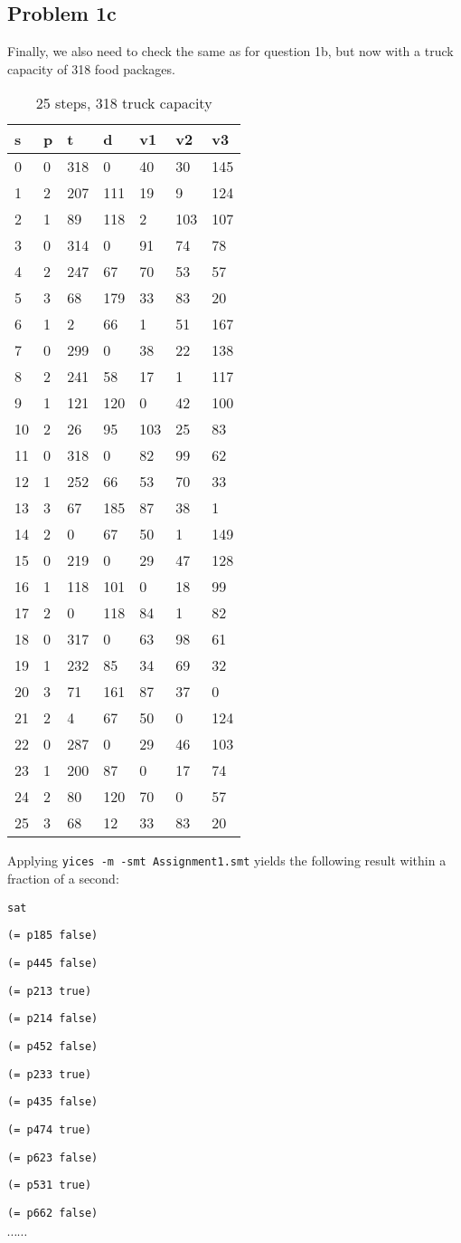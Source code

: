 \documentclass[a4paper]{article}
\begin{document}
	
	\subsection*{Problem 1c}
	Finally, we also need to check the same as for question 1b, but now with a truck capacity of 318 food packages.
	
	\begin{table}[!htb]
		\begin{longtable}[c]{@{}|l|l|l|l|l|l|l|@{}}
			\toprule
			s & p & t & d & v1 & v2 & v3\tabularnewline
			\midrule
			\endhead
			0 & 0 & 318 & 0 & 40 & 30 & 145\tabularnewline
			1 & 2 & 207 & 111 & 19 & 9 & 124\tabularnewline
			2 & 1 & 89 & 118 & 2 & 103 & 107\tabularnewline
			3 & 0 & 314 & 0 & 91 & 74 & 78\tabularnewline
			4 & 2 & 247 & 67 & 70 & 53 & 57\tabularnewline
			\rowcolor{Highlight}
			5 & 3 & 68 & 179 & 33 & 83 & 20\tabularnewline
			6 & 1 & 2 & 66 & 1 & 51 & 167\tabularnewline
			7 & 0 & 299 & 0 & 38 & 22 & 138\tabularnewline
			8 & 2 & 241 & 58 & 17 & 1 & 117\tabularnewline
			9 & 1 & 121 & 120 & 0 & 42 & 100\tabularnewline
			10 & 2 & 26 & 95 & 103 & 25 & 83\tabularnewline
			11 & 0 & 318 & 0 & 82 & 99 & 62\tabularnewline
			12 & 1 & 252 & 66 & 53 & 70 & 33\tabularnewline
			13 & 3 & 67 & 185 & 87 & 38 & 1\tabularnewline
			14 & 2 & 0 & 67 & 50 & 1 & 149\tabularnewline
			15 & 0 & 219 & 0 & 29 & 47 & 128\tabularnewline
			16 & 1 & 118 & 101 & 0 & 18 & 99\tabularnewline
			17 & 2 & 0 & 118 & 84 & 1 & 82\tabularnewline
			18 & 0 & 317 & 0 & 63 & 98 & 61\tabularnewline
			19 & 1 & 232 & 85 & 34 & 69 & 32\tabularnewline
			20 & 3 & 71 & 161 & 87 & 37 & 0\tabularnewline
			21 & 2 & 4 & 67 & 50 & 0 & 124\tabularnewline
			22 & 0 & 287 & 0 & 29 & 46 & 103\tabularnewline
			23 & 1 & 200 & 87 & 0 & 17 & 74\tabularnewline
			24 & 2 & 80 & 120 & 70 & 0 & 57\tabularnewline
			\rowcolor{Highlight}
			25 & 3 & 68 & 12 & 33 & 83 & 20\tabularnewline
			\bottomrule
		\end{longtable}
		\caption{25 steps, 318 truck capacity}
		\label{tab:1c}
	\end{table}

Applying {\tt yices -m -smt Assignment1.smt} yields the following result
within a fraction of a second:

{\footnotesize

{\tt sat }

{\tt (= p185 false)}

{\tt (= p445 false)}

{\tt (= p213 true)}

{\tt (= p214 false)}

{\tt (= p452 false)}

{\tt (= p233 true)}

{\tt (= p435 false)}

{\tt (= p474 true)}

{\tt (= p623 false)}

{\tt (= p531 true)}

{\tt (= p662 false)}

$\cdots \cdots$ }
\end{document}
